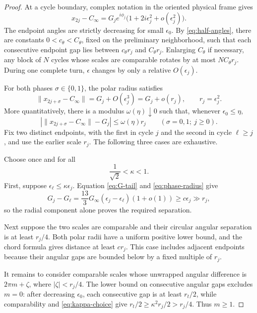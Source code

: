 \documentclass[smallextended,envcountsame]{svjour3}
\newcommand{\norm}[1]{\lVert #1\rVert}
\begin{document}
\begin{proof}
At a cycle boundary, complex notation in the oriented physical frame gives
\begin{equation}\label{eq:polar-boundary}
x_{2j}-C_\infty
=G_je^{i\phi_j}\bigl(1+2i\epsilon_j^2+o(\epsilon_j^2)\bigr).
\end{equation}
The endpoint angles are strictly decreasing for small $\epsilon_0$.  By
\eqref{eq:half-angles}, there are constants
$0<c_\theta<C_\theta$, fixed on the preliminary neighborhood, such that each
consecutive endpoint gap lies between $c_\theta r_j$ and
$C_\theta r_j$.  Enlarging $C_\theta$ if necessary, any block of $N$ cycles
whose scales are comparable rotates by at most $NC_\theta r_j$.  During one
complete turn, $\epsilon$ changes by only a relative $O(\epsilon_j)$.

For both phases $\sigma\in\{0,1\}$, the polar radius satisfies
\begin{equation}\label{eq:phase-radius}
\|x_{2j+\sigma}-C_\infty\|
=G_j+O(\epsilon_j^3)=G_j+o(r_j),
\qquad r_j=\epsilon_j^2.
\end{equation}
More quantitatively, there is a modulus $\omega(\eta)\downarrow0$ such that,
whenever $\epsilon_0\le\eta$,
\begin{equation}\label{eq:phase-radius-uniform}
\left|\norm{x_{2j+\sigma}-C_\infty}-G_j\right|
\le \omega(\eta)r_j
\qquad(\sigma=0,1;\ j\ge0).
\end{equation}
Fix two distinct endpoints, with the first in cycle $j$ and the second in
cycle $\ell\ge j$, and use the earlier scale $r_j$.  The following three
cases are exhaustive.

Choose once and for all
\begin{equation}\label{eq:kappa-choice}
\frac1{\sqrt2}<\kappa<1.
\end{equation}
First, suppose $\epsilon_\ell\le\kappa\epsilon_j$.
Equation \eqref{eq:G-tail} and
\eqref{eq:phase-radius} give
\[
G_j-G_\ell
=\frac{13}{3}G_\infty(\epsilon_j-\epsilon_\ell)(1+o(1))
\ge c\epsilon_j\gg r_j,
\]
so the radial component alone proves the required separation.

Next suppose the two scales are comparable and their circular angular
separation is at least $r_j/4$.  Both polar radii have a uniform positive
lower bound, and the chord formula gives distance at least $c r_j$.
This case includes adjacent endpoints because their angular gaps are bounded
below by a fixed multiple of $r_j$.

It remains to consider comparable scales whose unwrapped angular difference
is $2\pi m+\zeta$, where $|\zeta|<r_j/4$.  The lower bound on consecutive
angular gaps excludes $m=0$: after decreasing $\epsilon_0$, each consecutive
gap is at least $r_t/2$, while comparability and
\eqref{eq:kappa-choice} give
$r_t/2\ge\kappa^2r_j/2>r_j/4$.  Thus $m\ge1$.


\end{proof}
\end{document}
